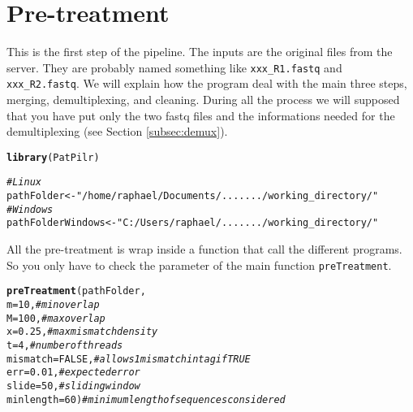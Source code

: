 \documentclass{article}\usepackage[]{graphicx}\usepackage[]{color}
\makeatletter
\newcommand{\hlnum}[1]{\textcolor[rgb]{0.686,0.059,0.569}{#1}}%
\newcommand{\hlstr}[1]{\textcolor[rgb]{0.192,0.494,0.8}{#1}}%
\newcommand{\hlcom}[1]{\textcolor[rgb]{0.678,0.584,0.686}{\textit{#1}}}%
\newcommand{\hlstd}[1]{\textcolor[rgb]{0.345,0.345,0.345}{#1}}%
\newcommand{\hlkwb}[1]{\textcolor[rgb]{0.69,0.353,0.396}{#1}}%
\newcommand{\hlkwc}[1]{\textcolor[rgb]{0.333,0.667,0.333}{#1}}%
\newcommand{\hlkwd}[1]{\textcolor[rgb]{0.737,0.353,0.396}{\textbf{#1}}}%
\newenvironment{kframe}{%
 \def\at@end@of@kframe{}%
 \ifinner\ifhmode%
  \def\at@end@of@kframe{\end{minipage}}%
  \begin{minipage}{\columnwidth}%
 \fi\fi%
 \def\FrameCommand##1{\hskip\@totalleftmargin \hskip-\fboxsep
 \colorbox{shadecolor}{##1}\hskip-\fboxsep
     \hskip-\linewidth \hskip-\@totalleftmargin \hskip\columnwidth}%
 \MakeFramed {\advance\hsize-\width
   \@totalleftmargin\z@ \linewidth\hsize
   \@setminipage}}%
 {\par\unskip\endMakeFramed%
 \at@end@of@kframe}
\newenvironment{knitrout}{}{} %
\makeatother
\begin{document}
\section{Pre-treatment}
\label{sec:pretreatment}
This is the first step of the pipeline. The inputs are the original files from the server. They are probably named something like \texttt{xxx\_R1.fastq} and \texttt{xxx\_R2.fastq}. We will explain how the program deal with the main three steps, merging, demultiplexing, and cleaning. During all the process we will supposed that you have put only the two fastq files and the informations needed for the demultiplexing (see Section \ref{subsec:demux}).

\begin{knitrout}
\color{fgcolor}\begin{kframe}
\begin{alltt}
\hlkwd{library}\hlstd{(PatPilr)}

\hlcom{#Linux}
\hlstd{pathFolder} \hlkwb{<-} \hlstr{"/home/raphael/Documents/......./working_directory/"}
\hlcom{#Windows}
\hlstd{pathFolderWindows} \hlkwb{<-} \hlstr{"C:/Users/raphael/......./working_directory/"}
\end{alltt}
\end{kframe}
\end{knitrout}

All the pre-treatment is wrap inside a function that call the different programs. So you only have to check the parameter of the main function \texttt{preTreatment}.

\begin{knitrout}
\color{fgcolor}\begin{kframe}
\begin{alltt}
\hlkwd{preTreatment}\hlstd{(pathFolder,}
  \hlkwc{m} \hlstd{=} \hlnum{10}\hlstd{,} \hlcom{# min overlap}
  \hlkwc{M} \hlstd{=} \hlnum{100}\hlstd{,} \hlcom{# max overlap}
  \hlkwc{x} \hlstd{=} \hlnum{0.25}\hlstd{,} \hlcom{# max mismatch density}
  \hlkwc{t} \hlstd{=} \hlnum{4}\hlstd{,} \hlcom{# number of threads}
  \hlkwc{mismatch} \hlstd{=} \hlnum{FALSE}\hlstd{,} \hlcom{# allows 1 mismatch in tag if TRUE}
  \hlkwc{err} \hlstd{=} \hlnum{0.01}\hlstd{,} \hlcom{# expected error}
  \hlkwc{slide} \hlstd{=} \hlnum{50}\hlstd{,} \hlcom{# sliding window}
  \hlkwc{minlength} \hlstd{=} \hlnum{60}\hlstd{)} \hlcom{# minimum length of sequences considered}
\end{alltt}
\end{kframe}
\end{knitrout}
\end{document}
